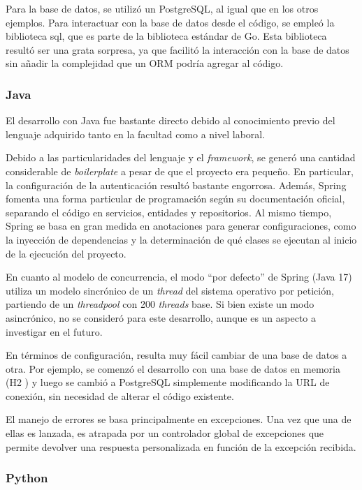 \documentclass[11pt]{article}
\let\Oldsubsubsection\subsubsection
\renewcommand{\subsubsection}{\FloatBarrier\Oldsubsubsection}
\newcommand{\english}[1]{\textit{#1}}
\begin{document}
Para la base de datos, se utilizó un PostgreSQL, al igual que en los otros ejemplos. Para interactuar con la base de datos desde el código, se empleó la biblioteca sql, que es parte de la biblioteca estándar de Go. Esta biblioteca resultó ser una grata sorpresa, ya que facilitó la interacción con la base de datos sin añadir la complejidad que un ORM podría agregar al código.


\subsubsection{Java}

El desarrollo con Java fue bastante directo debido al conocimiento previo del lenguaje adquirido tanto en la facultad como a nivel laboral.

Debido a las particularidades del lenguaje y el \english{framework}, se generó una cantidad considerable de \textit{boilerplate} a pesar de que el proyecto era pequeño. En particular, la configuración de la autenticación resultó bastante engorrosa. Además, Spring fomenta una forma particular de programación según su documentación oficial, separando el código en servicios, entidades y repositorios. Al mismo tiempo, Spring se basa en gran medida en anotaciones para generar configuraciones, como la inyección de dependencias y la determinación de qué clases se ejecutan al inicio de la ejecución del proyecto.

En cuanto al modelo de concurrencia, el modo ``por defecto'' de Spring (Java 17) utiliza un modelo sincrónico de un \english{thread} del sistema operativo por petición, partiendo de un \english{threadpool} con 200 \english{threads} base. Si bien existe un modo asincrónico, no se consideró para este desarrollo, aunque es un aspecto a investigar en el futuro.

En términos de configuración, resulta muy fácil cambiar de una base de datos a otra. Por ejemplo, se comenzó el desarrollo con una base de datos en memoria (H2 \cite{http:java:h2}) y luego se cambió a PostgreSQL simplemente modificando la URL de conexión, sin necesidad de alterar el código existente.

El manejo de errores se basa principalmente en excepciones. Una vez que una de ellas es lanzada, es atrapada por un controlador global de excepciones que permite devolver una respuesta personalizada en función de la excepción recibida.


\subsubsection{Python}
\end{document}
